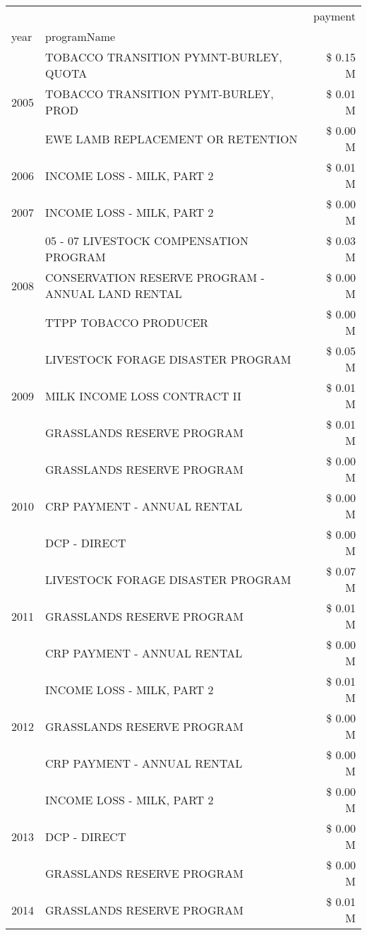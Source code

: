 \begin{tabular}{llr}
\toprule
 &  & payment \\
year & programName &  \\
\midrule
\multirow[t]{3}{*}{2005} & TOBACCO TRANSITION PYMNT-BURLEY, QUOTA & \$ 0.15 M \\
 & TOBACCO TRANSITION PYMT-BURLEY, PROD & \$ 0.01 M \\
 & EWE LAMB REPLACEMENT OR RETENTION & \$ 0.00 M \\
\cline{1-3}
2006 & INCOME LOSS - MILK, PART 2 & \$ 0.01 M \\
\cline{1-3}
2007 & INCOME LOSS - MILK, PART 2 & \$ 0.00 M \\
\cline{1-3}
\multirow[t]{3}{*}{2008} & 05 - 07 LIVESTOCK COMPENSATION PROGRAM & \$ 0.03 M \\
 & CONSERVATION RESERVE PROGRAM - ANNUAL LAND RENTAL & \$ 0.00 M \\
 & TTPP TOBACCO PRODUCER & \$ 0.00 M \\
\cline{1-3}
\multirow[t]{3}{*}{2009} & LIVESTOCK FORAGE DISASTER  PROGRAM & \$ 0.05 M \\
 & MILK INCOME LOSS CONTRACT II & \$ 0.01 M \\
 & GRASSLANDS RESERVE PROGRAM & \$ 0.01 M \\
\cline{1-3}
\multirow[t]{3}{*}{2010} & GRASSLANDS RESERVE PROGRAM & \$ 0.00 M \\
 & CRP PAYMENT - ANNUAL RENTAL & \$ 0.00 M \\
 & DCP - DIRECT & \$ 0.00 M \\
\cline{1-3}
\multirow[t]{3}{*}{2011} & LIVESTOCK FORAGE DISASTER PROGRAM & \$ 0.07 M \\
 & GRASSLANDS RESERVE PROGRAM & \$ 0.01 M \\
 & CRP PAYMENT - ANNUAL RENTAL & \$ 0.00 M \\
\cline{1-3}
\multirow[t]{3}{*}{2012} & INCOME LOSS - MILK, PART 2 & \$ 0.01 M \\
 & GRASSLANDS RESERVE PROGRAM & \$ 0.00 M \\
 & CRP PAYMENT - ANNUAL RENTAL & \$ 0.00 M \\
\cline{1-3}
\multirow[t]{3}{*}{2013} & INCOME LOSS - MILK, PART 2 & \$ 0.00 M \\
 & DCP - DIRECT & \$ 0.00 M \\
 & GRASSLANDS RESERVE PROGRAM & \$ 0.00 M \\
\cline{1-3}
\multirow[t]{3}{*}{2014} & GRASSLANDS RESERVE PROGRAM & \$ 0.01 M \\

\end{tabular}
